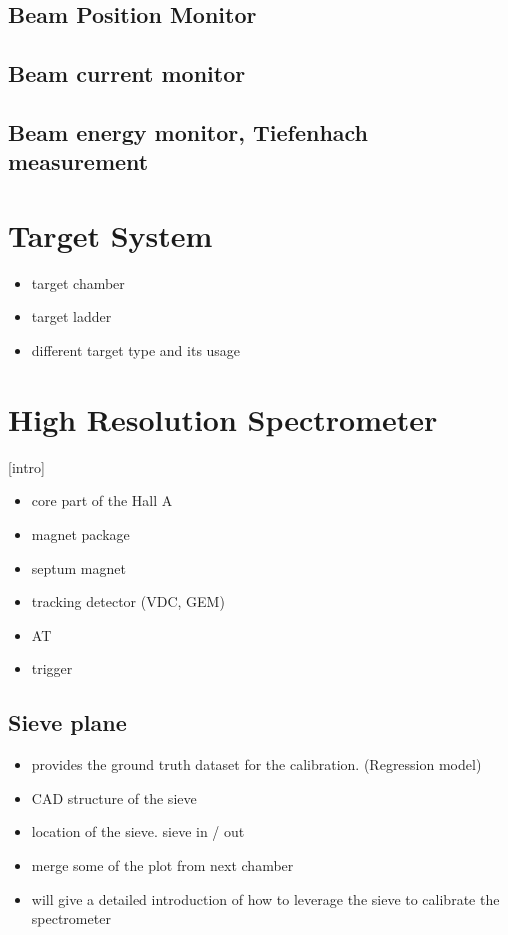 \subsection{Beam Position Monitor}
\subsection{Beam current monitor}
\subsection{Beam energy monitor, Tiefenhach measurement}

\section{Target System}

\begin{itemize}
    \item target chamber
    \item target ladder 
    \item different target type and its usage
\end{itemize}

\section{High Resolution Spectrometer}

[intro]

\begin{itemize}
    \item core part of the Hall A 
    \item magnet package
    \item septum magnet
    \item tracking detector (VDC, GEM)
    \item AT
    \item trigger
\end{itemize}

\subsection{Sieve plane}

\begin{itemize}
    \item provides the ground truth dataset for the calibration. (Regression model)
    \item CAD structure of the sieve 
    \item location of the sieve. sieve in / out
    \item merge some of the plot from next chamber
    \item  will give a detailed introduction of how to leverage the sieve to calibrate the spectrometer
\end{itemize}

